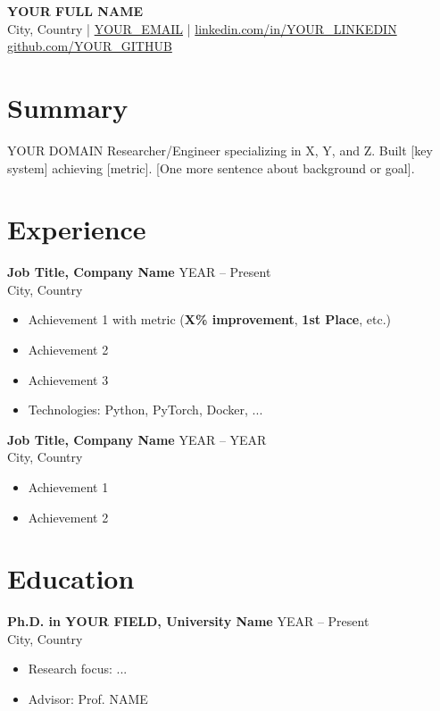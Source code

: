 \documentclass[10pt,a4paper]{article}
\begin{document}
{\LARGE \textbf{YOUR FULL NAME}}\\
City, Country \;|\; \href{mailto:YOUR_EMAIL}{YOUR\_EMAIL} \;|\;
\href{https://linkedin.com/in/YOUR_LINKEDIN}{linkedin.com/in/YOUR\_LINKEDIN}\\
\href{https://github.com/YOUR_GITHUB}{github.com/YOUR\_GITHUB}

\section*{Summary}
YOUR DOMAIN Researcher/Engineer specializing in X, Y, and Z. Built [key system] achieving [metric]. [One more sentence about background or goal].

\section*{Experience}

\textbf{Job Title, Company Name} \hfill YEAR -- Present\\
City, Country
\begin{itemize}
    \item Achievement 1 with metric (\textbf{X\% improvement}, \textbf{1st Place}, etc.)
    \item Achievement 2
    \item Achievement 3
    \item Technologies: Python, PyTorch, Docker, ...
\end{itemize}

\textbf{Job Title, Company Name} \hfill YEAR -- YEAR\\
City, Country
\begin{itemize}
    \item Achievement 1
    \item Achievement 2
\end{itemize}


\section*{Education}

\textbf{Ph.D. in YOUR FIELD, University Name} \hfill YEAR -- Present\\
City, Country
\begin{itemize}
    \item Research focus: ...
    \item Advisor: Prof. NAME
\end{itemize}
\end{document}
